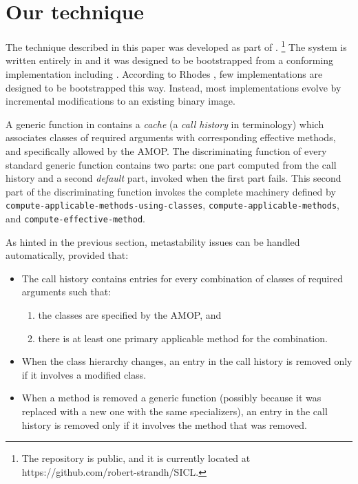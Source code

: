 \section{Our technique}

The technique described in this paper was developed as part of
\sicl{}.%
\footnote{The \sicl{} repository is public, and it is currently
  located at https://github.com/robert-strandh/SICL.}  The system is
written entirely in \cl{} and it was designed to be bootstrapped 
from a conforming \cl{} implementation including \clos{}.  
According to Rhodes \cite{Rhodes:2008:SSC:1482373.1482380}, few \cl{}
implementations are designed to be bootstrapped this way.  Instead,
most implementations evolve by incremental modifications to an
existing binary image.

A generic function in \sicl{} contains a \emph{cache} (a \emph{call
  history} in \sicl{} terminology) which associates classes of
required arguments with corresponding effective methods, and
specifically allowed by the AMOP.  The discriminating function of
every standard generic function contains two parts: one part computed
from the call history and a second \emph{default} part, invoked when
the first part fails.  This second part of the discriminating function
invokes the complete machinery defined by
\texttt{compute-applicable-methods-using-classes},
\texttt{compute-applicable-methods}, and
\texttt{compute-effective-method}.

As hinted in the previous section, metastability issues can be handled
automatically, provided that:

\begin{itemize}
\item The call history contains entries for every combination of
  classes of required arguments such that:
  \begin{enumerate}
  \item the classes are specified by the AMOP, and 
  \item there is at least one primary applicable method for the
    combination.
  \end{enumerate}
\item When the class hierarchy changes, an entry in the call history
  is removed only if it involves a modified class.
\item When a method is removed a generic function (possibly because it
  was replaced with a new one with the same specializers), an entry in
  the call history is removed only if it involves the method that was
  removed.
\end{itemize}

